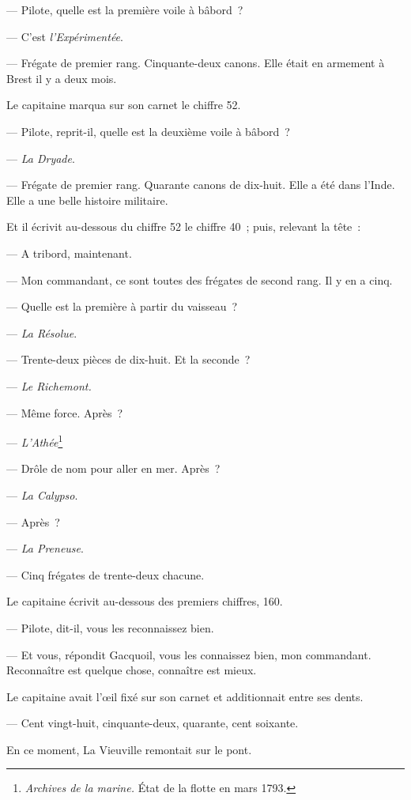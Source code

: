 \documentclass[french,twoside]{book} %
\begin{document}
— Pilote, quelle est la première voile à bâbord ?\par
— C’est \emph{l’Expérimentée}.\par
 — Frégate de premier rang. Cinquante-deux canons. Elle était en armement à Brest il y a deux mois.\par
Le capitaine marqua sur son carnet le chiffre 52.\par
— Pilote, reprit-il, quelle est la deuxième voile à bâbord ?\par
— \emph{La Dryade}.\par
— Frégate de premier rang. Quarante canons de dix-huit. Elle a été dans l’Inde. Elle a une belle histoire militaire.\par
Et il écrivit au-dessous du chiffre 52 le chiffre 40 ; puis, relevant la tête :\par
— A tribord, maintenant.\par
— Mon commandant, ce sont toutes des frégates de second rang. Il y en a cinq.\par
— Quelle est la première à partir du vaisseau ?\par
— \emph{La Résolue}.\par
— Trente-deux pièces de dix-huit. Et la seconde ?\par
— \emph{Le Richemont.}\par
— Même force. Après ?\par
— \emph{L’Athée}\footnote{ \noindent \emph{Archives de la marine.} État de la flotte en mars 1793.
 }\par
— Drôle de nom pour aller en mer. Après ?\par
— \emph{La Calypso}.\par
— Après ?\par
— \emph{La Preneuse}.\par
— Cinq frégates de trente-deux chacune.\par
Le capitaine écrivit au-dessous des premiers chiffres, 160.\par
— Pilote, dit-il, vous les reconnaissez bien.\par
 — Et vous, répondit Gacquoil, vous les connaissez bien, mon commandant. Reconnaître est quelque chose, connaître est mieux.\par
Le capitaine avait l’œil fixé sur son carnet et additionnait entre ses dents.\par
— Cent vingt-huit, cinquante-deux, quarante, cent soixante.\par
En ce moment, La Vieuville remontait sur le pont.\par
\end{document}
